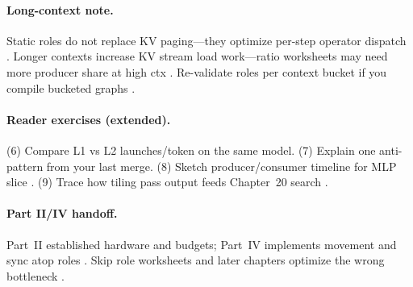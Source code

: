 \paragraph{Long-context note.}
Static roles do not replace KV paging---they optimize per-step operator dispatch \citep{kwon2023vllm,dao2023flashdecoding}.
Longer contexts increase KV stream load work---ratio worksheets may need more producer share at high ctx \citep{patel2025llminference,semianalysis2024tma,shah2024flashattention3}.
Re-validate roles per context bucket if you compile bucketed graphs \citep{yirage2026,amd2024xdna,mpk2025}.

\paragraph{Reader exercises (extended).}
(6) Compare L1 vs L2 launches/token on the same model. (7) Explain one anti-pattern from your last merge. (8) Sketch producer/consumer timeline for MLP slice \citep{dao2022flashattention,taxbreak2026,shah2024flashattention3,yirage2026,patel2025llminference,mpk2025,kwon2023vllm,memoryfloor2026,wu2024mirage,chen2020compilerbasedhardw}.
(9) Trace how tiling pass output feeds Chapter~20 search \citep{wu2024mirage,mpk2025,yirage2026}.

\paragraph{Part II/IV handoff.}
Part~II established hardware and budgets; Part~IV implements movement and sync atop roles \citep{nvidia2022hopper,amd2024xdna,chen2020compilerbasedhardw,semianalysis2024tma,dao2022flashattention,shah2024flashattention3,mpk2025,patel2025llminference,taxbreak2026,memoryfloor2026,yirage2026,wu2024mirage}.
Skip role worksheets and later chapters optimize the wrong bottleneck \citep{taxbreak2026,memoryfloor2026}.

